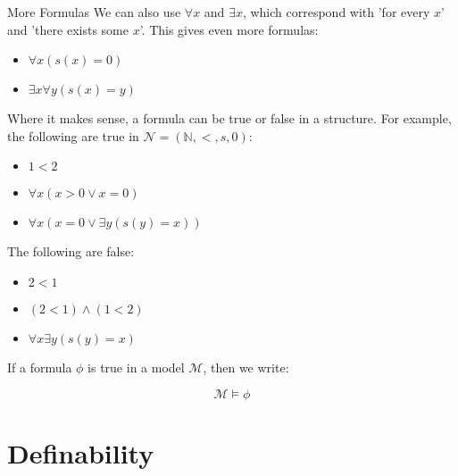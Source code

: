 \documentclass{beamer}
\begin{document}
\begin{frame}{More Formulas}
    We can also use $\forall x$ and $\exists x$, which correspond with 'for every $x$' and 'there exists some $x$'. This gives even more formulas:
    
    \begin{itemize}
        \item $\forall x(s(x) = 0)$
        \item $\exists x \forall y (s(x) = y)$
    \end{itemize}
    
    Where it makes sense, a formula can be true or false in a structure. For example, the following are true in $\mathcal{N} = (\mathbb{N}, <, s, 0)$:
    \begin{itemize}
        \item $1 < 2$
        \item $\forall x (x > 0 \lor x = 0)$
        \item $\forall x (x = 0 \lor \exists y(s(y) = x))$
    \end{itemize}
    
    The following are false:
    \begin{itemize}
        \item $2 < 1$
        \item $(2 < 1) \land (1 < 2)$
        \item $\forall x \exists y( s(y) = x)$
    \end{itemize}
    
    If a formula $\phi$ is true in a model $\mathcal{M}$, then we write:
    
    $$ \mathcal{M} \models \phi$$
\end{frame}

\section{Definability}
\end{document}
